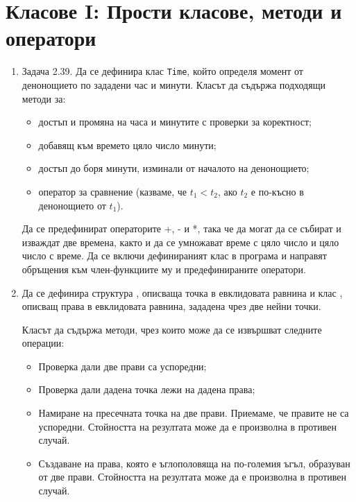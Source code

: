 \clearpage\section {Класове I: Прости класове, методи и оператори}

\begin{enumerate}


\item Задача 2.39.\cite{sbornik2} Да се дефинира клас \texttt{Time}, който определя момент от денонощието по зададени час и минути. Класът да съдържа подходящи методи за:

\begin{itemize}

 \item достъп и промяна на часа и минутите с проверки за коректност;
 \item добавящ към времето цяло число минути;
 \item достъп до боря минути, изминали от началото на денонощието;
 \item оператор за сравнение (казваме, че $t_1 < t_2$, ако $t_2$ е по-късно в денонощието от $t_1$).

\end{itemize}


Да се предефинират операторите +, - и *, така че да могат да се събират и изваждат две времена, както и да се умножават време с цяло число и цяло число с време. Да се включи дефинираният клас в програма и направят обръщения към член-функциите му и предефинираните оператори.

\item Да се дефинира структура , описваща точка в евклидовата равнина и клас  , описващ права в евклидовата равнина, зададена чрез две нейни точки.

Класът  да съдържа методи, чрез които може да се извършват следните операции:

\begin{itemize}
	\item Проверка дали две прави са успоредни;
	\item Проверка дали дадена точка лежи на дадена права;
	\item Намиране на пресечната точка на две прави. Приемаме, че правите не са успоредни. Стойността на резултата може да е произволна в противен случай.
	\item Създаване на права, която е ъглополовяща на по-големия ъгъл, образуван от две прави. Стойността на резултата може да е произволна в противен случай.
\end{itemize}


\end{enumerate}
